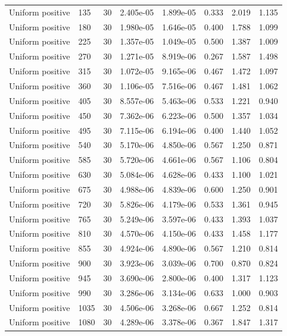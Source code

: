 \begin{scriptsize}
\begin{longtable}{llrrrrrr}
Uniform positive & 135 & 30 & 2.405e-05 & 1.899e-05 & 0.333 & 2.019 & 1.135 \\
Uniform positive & 180 & 30 & 1.980e-05 & 1.646e-05 & 0.400 & 1.788 & 1.099 \\
Uniform positive & 225 & 30 & 1.357e-05 & 1.049e-05 & 0.500 & 1.387 & 1.009 \\
Uniform positive & 270 & 30 & 1.271e-05 & 8.919e-06 & 0.267 & 1.587 & 1.498 \\
Uniform positive & 315 & 30 & 1.072e-05 & 9.165e-06 & 0.467 & 1.472 & 1.097 \\
Uniform positive & 360 & 30 & 1.106e-05 & 7.516e-06 & 0.467 & 1.481 & 1.062 \\
Uniform positive & 405 & 30 & 8.557e-06 & 5.463e-06 & 0.533 & 1.221 & 0.940 \\
Uniform positive & 450 & 30 & 7.362e-06 & 6.223e-06 & 0.500 & 1.357 & 1.034 \\
Uniform positive & 495 & 30 & 7.115e-06 & 6.194e-06 & 0.400 & 1.440 & 1.052 \\
Uniform positive & 540 & 30 & 5.170e-06 & 4.850e-06 & 0.567 & 1.250 & 0.871 \\
Uniform positive & 585 & 30 & 5.720e-06 & 4.661e-06 & 0.567 & 1.106 & 0.804 \\
Uniform positive & 630 & 30 & 5.084e-06 & 4.628e-06 & 0.433 & 1.100 & 1.021 \\
Uniform positive & 675 & 30 & 4.988e-06 & 4.839e-06 & 0.600 & 1.250 & 0.901 \\
Uniform positive & 720 & 30 & 5.826e-06 & 4.179e-06 & 0.533 & 1.361 & 0.945 \\
Uniform positive & 765 & 30 & 5.249e-06 & 3.597e-06 & 0.433 & 1.393 & 1.037 \\
Uniform positive & 810 & 30 & 4.570e-06 & 4.150e-06 & 0.433 & 1.458 & 1.177 \\
Uniform positive & 855 & 30 & 4.924e-06 & 4.890e-06 & 0.567 & 1.210 & 0.814 \\
Uniform positive & 900 & 30 & 3.923e-06 & 3.039e-06 & 0.700 & 0.870 & 0.824 \\
Uniform positive & 945 & 30 & 3.690e-06 & 2.800e-06 & 0.400 & 1.317 & 1.123 \\
Uniform positive & 990 & 30 & 3.286e-06 & 3.134e-06 & 0.633 & 1.000 & 0.903 \\
Uniform positive & 1035 & 30 & 4.506e-06 & 3.268e-06 & 0.667 & 1.252 & 0.814 \\
Uniform positive & 1080 & 30 & 4.289e-06 & 3.378e-06 & 0.367 & 1.847 & 1.317 \\

\end{longtable}
\end{scriptsize}
